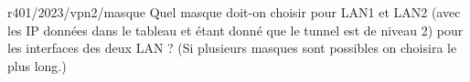 \begin{question}{r401/2023/vpn2/masque}
  Quel masque doit-on choisir pour LAN1 et LAN2 (avec les IP données
  dans le tableau et étant donné que le tunnel est de niveau 2) pour
  les interfaces des deux LAN ? (Si plusieurs masques sont possibles
  on choisira le plus long.)
  \begin{reponseshoriz}
  \end{reponseshoriz}
\end{question}
